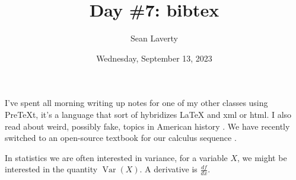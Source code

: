 \documentclass[12pt]{article}
\author{Sean Laverty}
\title{Day \#7: bibtex}
\date{Wednesday, September 13, 2023}
\newcommand{\Var}[0]{\operatorname{Var}}
\newcommand{\ddx}[1]{\frac{d #1}{dx}}
\begin{document}
\maketitle
\newpage


I've spent all morning writing up notes for one of my other classes using PreTeXt, it's a language that sort of hybridizes {\LaTeX} and xml or html.  I also read about weird, possibly fake, topics in American history \citep{smit54}.  We have recently switched to an open-source textbook for our calculus sequence \citep{openstax}.

In statistics we are often interested in variance, for a variable \(X\), we might be interested in the quantity \(\Var(X)\). A derivative is \(\ddx{f}\).




\end{document}
